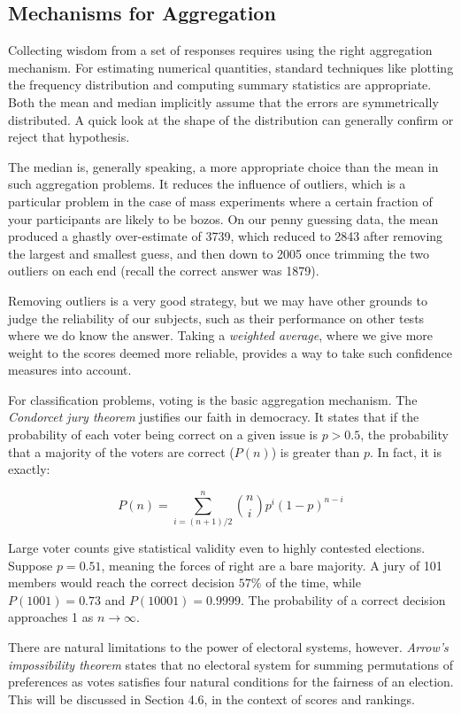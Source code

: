 \documentclass[10pt]{article}
\begin{document}
\subsection{Mechanisms for Aggregation}

Collecting wisdom from a set of responses requires using the right aggregation mechanism. For estimating numerical quantities, standard techniques like plotting the frequency distribution and computing summary statistics are appropriate. Both the mean and median implicitly assume that the errors are symmetrically distributed. A quick look at the shape of the distribution can generally confirm or reject that hypothesis.

The median is, generally speaking, a more appropriate choice than the mean in such aggregation problems. It reduces the influence of outliers, which is a particular problem in the case of mass experiments where a certain fraction of your participants are likely to be bozos. On our penny guessing data, the mean produced a ghastly over-estimate of 3739, which reduced to 2843 after removing the largest and smallest guess, and then down to 2005 once trimming the two outliers on each end (recall the correct answer was 1879).

Removing outliers is a very good strategy, but we may have other grounds to judge the reliability of our subjects, such as their performance on other tests where we do know the answer. Taking a \textit{weighted average}, where we give more weight to the scores deemed more reliable, provides a way to take such confidence measures into account.

For classification problems, voting is the basic aggregation mechanism. The \textit{Condorcet jury theorem} justifies our faith in democracy. It states that if the probability of each voter being correct on a given issue is $p>0.5$, the probability that a majority of the voters are correct ($P(n)$) is greater than $p$. In fact, it is exactly:

$$
P(n) = \sum_{i=(n+1)/2}^{n}\binom{n}{i} p^{i}(1-p)^{n-i}
$$

Large voter counts give statistical validity even to highly contested elections. Suppose $p=0.51$, meaning the forces of right are a bare majority. A jury of 101 members would reach the correct decision $57\%$ of the time, while $P(1001)=0.73$ and $P(10001)=0.9999$. The probability of a correct decision approaches 1 as $n \rightarrow \infty$.

There are natural limitations to the power of electoral systems, however. \textit{Arrow's impossibility theorem} states that no electoral system for summing permutations of preferences as votes satisfies four natural conditions for the fairness of an election. This will be discussed in Section 4.6, in the context of scores and rankings.
\end{document}
